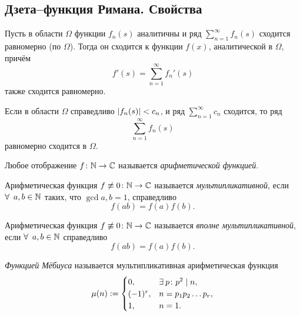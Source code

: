 \subsection{Дзета--функция Римана. Свойства}
\label{subsec:I-3}

\begin{theorem}[Вейерштрасса]
	Пусть в области $\Omega$ функции $f_n(s)$ аналитичны и ряд $\sum_{n=1}^\infty f_n(s)$ сходится равномерно (по $\Omega$). Тогда он сходится к функции $f(x)$, аналитической в $\Omega$, причём
	\[
	    f'(s) = \sum_{n=1}^\infty f_n'(s)
	\]
	также сходится равномерно.
\end{theorem}

\begin{test}[Вейерштрасса]
	Если в области $\Omega$ справедливо $\left| f_n(s) \right| < c_n$, и ряд $\sum_{n=1}^\infty c_n$ сходится, то ряд
	\[
	    \sum_{n=1}^\infty f_n(s)
	\]
	равномерно сходится в $\Omega$.
\end{test}

\begin{ndefinition}
\label{def:I_arithmetic-function}
	Любое отображение $f\colon \mathbb{N} \to \mathbb{C}$ называется \emph{арифметической функцией}.
\end{ndefinition}

\begin{ndefinition}
\label{def:I_multiplicative-function}
	Арифметическая функция $f \not\equiv 0\colon \mathbb{N} \to \mathbb{C}$ называется \emph{мультипликативной}, если $\forall~a, b \in \NN$ таких, что $\gcd{a, b} = 1$, справедливо
	\[
		f(ab) = f(a)f(b).
	\]
\end{ndefinition}

\begin{ndefinition}
\label{def:I_completely-multiplicative-function}
	Арифметическая функция $f \not\equiv 0\colon \mathbb{N} \to \mathbb{C}$ называется \emph{вполне мультипликативной}, если $\forall~a, b \in \NN$ справедливо
	\[
		f(ab) = f(a)f(b).
	\]
\end{ndefinition}

\begin{ndefinition}
\label{def:I_Mobius-function}
	\emph{Функцией Мёбиуса} называется мультипликативная арифметическая функция
	\[
	    \mu(n) := 
	    \begin{cases}
	    	0, & \exists p\colon p^2 \divides n, \\
	    	(-1)^r, & n = p_1p_2 \dots p_r, \\
	    	1, & n = 1.
	    \end{cases}
	\]
\end{ndefinition}

